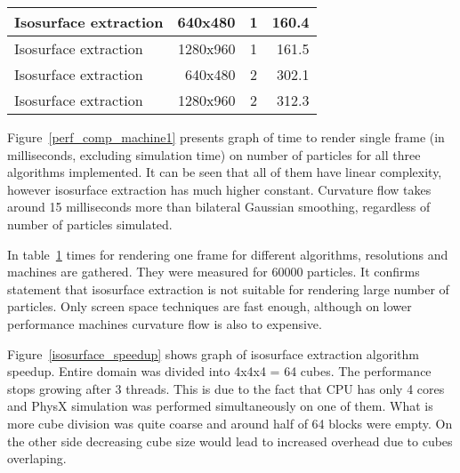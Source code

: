 \begin{table}
\begin{tabular} { l | r | c | r }
      Isosurface extraction                    &          640x480                &              1                  &            160.4               \\ \hline     
      Isosurface extraction                    &          1280x960               &              1                  &           161.5                   \\ \hline      
      Isosurface extraction                    &          640x480                &              2                  &            302.1               \\ \hline
      Isosurface extraction                    &          1280x960               &              2                  &           312.3               \\ 
   \end{tabular}
   \label{tab:frame_time}
\end{table}


Figure~\ref{perf_comp_machine1} presents graph of time to render single frame (in milliseconds, excluding simulation time) on number of particles for all three algorithms implemented. It can be seen that all of them have linear complexity, however isosurface extraction has much higher constant. Curvature flow takes around 15 milliseconds more than bilateral Gaussian smoothing, regardless of number of particles simulated. 

In table~\ref{tab:frame_time} times for rendering one frame for different algorithms, resolutions and machines are gathered. They were measured for 60000 particles. It confirms statement that isosurface extraction is not suitable for rendering large number of particles. Only screen space techniques are fast enough, although on lower performance machines curvature flow is also to expensive.


Figure~\ref{isosurface_speedup} shows graph of isosurface extraction algorithm speedup. Entire domain was divided into 4x4x4 = 64 cubes. The performance stops growing after 3 threads. This is due to the fact that CPU has only 4 cores and PhysX simulation was performed simultaneously on one of them. What is more cube division was quite coarse and around half of 64 blocks were empty. On the other side decreasing cube size would lead to increased overhead due to cubes overlaping. 

